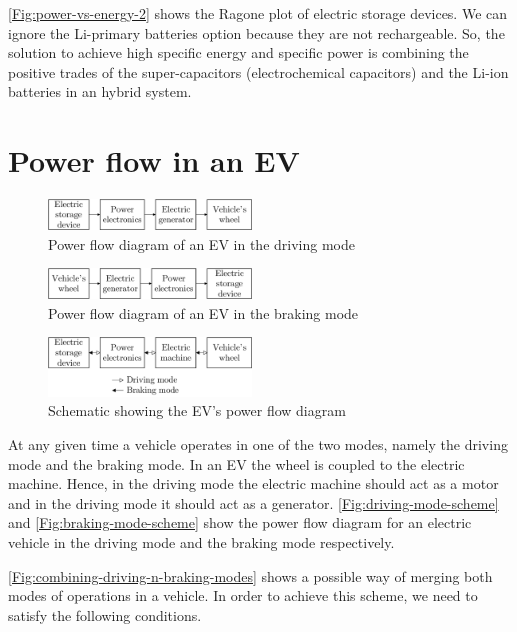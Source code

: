 \documentclass[journal]{IEEEtran}
\begin{document}
\autoref{Fig:power-vs-energy-2} shows the Ragone plot of electric storage devices. We can ignore the Li-primary batteries option because they are not rechargeable. So, the solution to achieve high specific energy and specific power is combining the positive trades of the super-capacitors (electrochemical capacitors) and the Li-ion batteries in an hybrid system.
\section{Power flow in an EV}
\begin{figure}
	\centering
	\includegraphics[width=0.48\textwidth]{driving-mode-scheme}
	\caption{Power flow diagram of an EV in the driving mode}
	\label{Fig:driving-mode-scheme}
\end{figure}
\begin{figure}
	\centering
	\includegraphics[width=0.48\textwidth]{braking-mode-scheme}
	\caption{Power flow diagram of an EV in the braking mode}
	\label{Fig:braking-mode-scheme}
\end{figure}
\begin{figure}
	\centering
	\includegraphics[width=0.48\textwidth]{combining-driving-n-braking-modes}
	\caption{Schematic showing the EV's power flow diagram}
	\label{Fig:combining-driving-n-braking-modes}
\end{figure}
At any given time a vehicle operates in one of the two modes, namely the driving mode and the braking mode. In an EV the wheel is coupled to the electric machine. Hence, in the driving mode the electric machine should act as a motor and in the driving mode it should act as a generator. \autoref{Fig:driving-mode-scheme} and \autoref{Fig:braking-mode-scheme} show the power flow diagram for an electric vehicle in the driving mode and the braking mode respectively.

\autoref{Fig:combining-driving-n-braking-modes} shows a possible way of merging both modes of operations in a vehicle. In order to achieve this scheme, we need to satisfy the following conditions.
\end{document}
